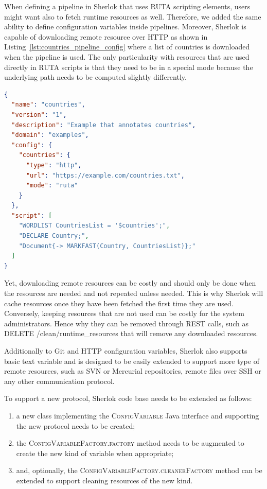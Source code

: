 \documentclass{article}
\newcommand{\ID}[1]{{\textsc{#1}}}
\newcommand{\REST}[1]{\textsf{#1}}
\begin{document}
When defining a pipeline in Sherlok that uses RUTA scripting elements, users might want also to
fetch runtime resources as well. Therefore, we added the same ability to define configuration
variables inside pipelines. Moreover, Sherlok is capable of downloading remote resource over HTTP as
shown in Listing~\ref{lst:countries_pipeline_config} where a list of countries is downloaded when
the pipeline is used. The only particularity with resources that are used directly in RUTA scripts
is that they need to be in a special mode because the underlying path needs to be computed slightly
differently.

\begin{lstlisting}[float,language=json,
                   caption=Configuration of the \ID{countries} pipeline,
                   label=lst:countries_pipeline_config]
{
  "name": "countries",
  "version": "1",
  "description": "Example that annotates countries",
  "domain": "examples",
  "config": {
    "countries": {
      "type": "http",
      "url": "https://example.com/countries.txt",
      "mode": "ruta"
    }
  },
  "script": [
    "WORDLIST CountriesList = '$countries';",
    "DECLARE Country;",
    "Document{-> MARKFAST(Country, CountriesList)};"
  ]
}
\end{lstlisting}

Yet, downloading remote resources can be costly and should only be done when the resources are
needed and not repeated unless needed. This is why Sherlok will cache resources once they have been
fetched the first time they are used. Conversely, keeping resources that are not used can be costly
for the system administrators. Hence why they can be removed through REST calls, such as \REST{DELETE
/clean/runtime\_resources} that will remove any downloaded resources.

Additionally to Git and HTTP configuration variables, Sherlok also supports basic text variable and
is designed to be easily extended to support more type of remote resources, such as SVN or Mercurial
repositories, remote files over SSH or any other communication protocol.

To support a new protocol, Sherlok code base needs to be extended as follows:

\begin{enumerate}
    \item a new class implementing the \ID{ConfigVariable} Java interface and supporting the new
        protocol needs to be created;
    \item the \ID{ConfigVariableFactory.factory} method needs to be augmented to create the new kind of
        variable when appropriate;
    \item and, optionally, the \ID{ConfigVariableFactory.cleanerFactory} method can be extended to
        support cleaning resources of the new kind.
\end{enumerate}
\end{document}
